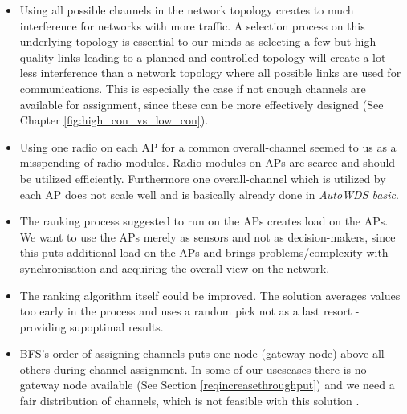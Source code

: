     \begin{itemize}
      \item Using all possible channels in the network topology creates to much interference for networks with more traffic.
	A selection process on this underlying topology is essential to our minds as selecting a few but high quality links
	leading to a planned and controlled topology will create a lot less interference than a network topology where all possible 	links are used for communications.
	This is especially the case if not enough channels are available for assignment,
	since these can be more effectively designed (See Chapter \ref{fig:high_con_vs_low_con}).
	\label{topologypreservingdealbreaker}
	
      \item Using one radio on each \ac{AP} for a common overall-channel seemed to us as a misspending of radio modules.
	Radio modules on APs are scarce and should be utilized efficiently. 
	Furthermore one overall-channel which is utilized by each \ac{AP} does not scale well and is basically already done in \textit{AutoWDS basic}.
	
      \item The ranking process suggested to run on the APs creates load on the APs.
	We want to use the APs merely as sensors and not as decision-makers, 
	since this puts additional load on the APs and brings problems/complexity with synchronisation and acquiring the overall view on the network.
	
      \item The ranking algorithm itself could be improved. 
	The solution averages values too early in the process and uses a random pick not as a last resort - providing supoptimal results.
	
      \item \ac{BFS}'s order of assigning channels puts one node (gateway-node) above all others during channel assignment.
	In some of our usescases there is no gateway node available (See Section \ref{reqincreasethroughput}) and we need a fair distribution of channels, 
	which is not feasible with this solution \cite{overview_caa}.
    \end{itemize}

